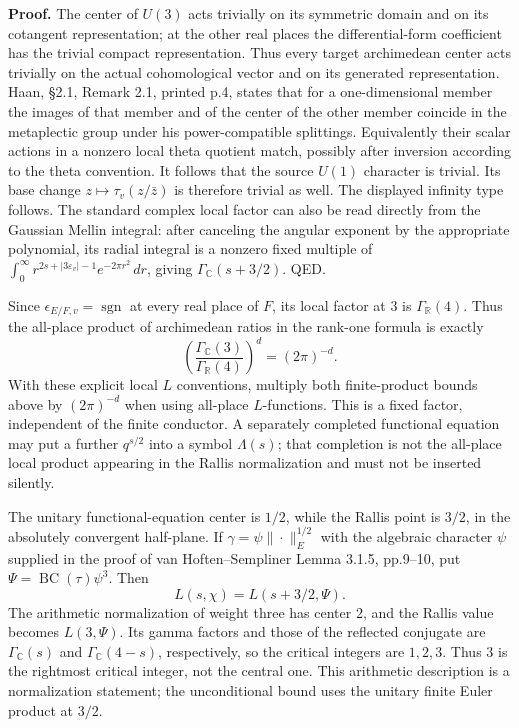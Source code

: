 \documentclass[11pt,a4paper]{article}
\theoremstyle{definition}
\begin{document}
\textbf{Proof.} The center of \(U(3)\) acts trivially on its symmetric domain and on its cotangent representation; at the other real places the differential-form coefficient has the trivial compact representation. Thus every target archimedean center acts trivially on the actual cohomological vector and on its generated representation. Haan, §2.1, Remark 2.1, printed p.4, states that for a one-dimensional member the images of that member and of the center of the other member coincide in the metaplectic group under his power-compatible splittings. Equivalently their scalar actions in a nonzero local theta quotient match, possibly after inversion according to the theta convention. It follows that the source \(U(1)\) character is trivial. Its base change \(z\mapsto\tau_v(z/\bar z)\) is therefore trivial as well. The displayed infinity type follows. The standard complex local factor can also be read directly from the Gaussian Mellin integral: after canceling the angular exponent by the appropriate polynomial, its radial integral is a nonzero fixed multiple of \(\int_0^\infty r^{2s+|3\varepsilon_v|-1}e^{-2\pi r^2}\,dr\), giving \(\Gamma_{\mathbb C}(s+3/2)\). QED.

Since \(\epsilon_{E/F,v}=\operatorname{sgn}\) at every real place of \(F\), its local factor at \(3\) is \(\Gamma_{\mathbb R}(4)\). Thus the all-place product of archimedean ratios in the rank-one formula is exactly \[
 \left(\frac{\Gamma_{\mathbb C}(3)}{\Gamma_{\mathbb R}(4)}\right)^d
 =(2\pi)^{-d}.
\tag{B1a.2}
\] With these explicit local \(L\) conventions, multiply both finite-product bounds above by \((2\pi)^{-d}\) when using all-place \(L\)-functions. This is a fixed factor, independent of the finite conductor. A separately completed functional equation may put a further \(q^{s/2}\) into a symbol \(\Lambda(s)\); that completion is not the all-place local product appearing in the Rallis normalization and must not be inserted silently.

The unitary functional-equation center is \(1/2\), while the Rallis point is \(3/2\), in the absolutely convergent half-plane. If \(\gamma=\psi\|\cdot\|_E^{1/2}\) with the algebraic character \(\psi\) supplied in the proof of van Hoften--Sempliner Lemma 3.1.5, pp.9--10, put \(\Psi=\operatorname{BC}(\tau)\psi^3\). Then \[
 L(s,\chi)=L(s+3/2,\Psi).
\] The arithmetic normalization of weight three has center \(2\), and the Rallis value becomes \(L(3,\Psi)\). Its gamma factors and those of the reflected conjugate are \(\Gamma_{\mathbb C}(s)\) and \(\Gamma_{\mathbb C}(4-s)\), respectively, so the critical integers are \(1,2,3\). Thus \(3\) is the rightmost critical integer, not the central one. This arithmetic description is a normalization statement; the unconditional bound uses the unitary finite Euler product at \(3/2\).
\end{document}
